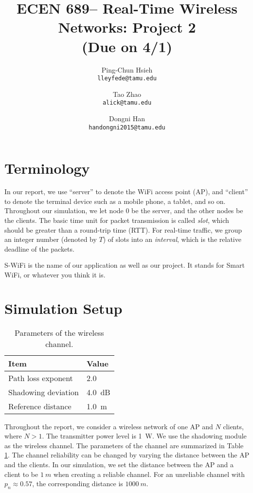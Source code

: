 \documentclass{article}
\begin{document}
\title{\bf ECEN 689-- Real-Time Wireless Networks: Project 2\\ (Due on 4/1)}
\date{}
\author{%
Ping-Chun Hsieh\\
\texttt{lleyfede@tamu.edu}
\and
Tao Zhao\\
\texttt{alick@tamu.edu}
\and
Dongni Han\\
\texttt{handongni2015@tamu.edu}
}
\maketitle

\section*{Terminology}

In our report, we use ``server'' to denote the WiFi access point (AP), and
``client'' to denote the terminal device such as a mobile phone, a tablet, and
so on. Throughout our simulation, we let node $0$ be the server, and the other nodes be the clients. The basic time unit for packet transmission is called \emph{slot}, which should be greater than a round-trip time (RTT). For real-time traffic, we group an integer number (denoted by $T$) of slots into an \emph{interval}, which is the relative deadline of the packets. 

S-WiFi is the name of our application as well as our project. It stands for
Smart WiFi, or whatever you think it is.

\section*{Simulation Setup}
\begin{table}[htbp]
\centering
    \caption{Parameters of the wireless channel.}
    \vspace{2mm}
    \begin{tabular}{ | l | l | }
    \hline
    Item & Value \\ \hline
    Path loss exponent & 2.0  \\ \hline
    Shadowing deviation & \SI{4.0}{dB} \\ \hline
    Reference distance & \SI{1.0}{m} \\
    \hline
\end{tabular}
\label{table: channel}
\end{table}
Throughout the report, we consider a wireless network of one AP and $N$ clients, where $N>1$. The transmitter power level is \SI{1}{W}. We use the shadowing module as the wireless channel. The parameters of the channel are summarized in Table \ref{table: channel}. The channel reliability can be changed by varying the distance between the AP and the clients. In our simulation, we set the distance between the AP and a client to be $\SI{1}{m}$ when creating a reliable channel. For an unreliable channel with $p_n\approx 0.57$, the corresponding distance is $\SI{1000}{m}$. 
\end{document}
